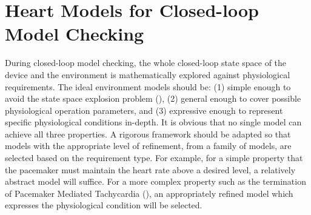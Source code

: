 \section{Heart Models for Closed-loop Model Checking}
During closed-loop model checking, the whole closed-loop state space of the device and the environment is mathematically explored against physiological requirements. The  ideal environment models should be: (1) simple enough to avoid the state space explosion problem (\cite{Abstraction}), (2) general enough to cover possible physiological operation parameters, and (3) expressive enough to represent specific physiological conditions in-depth. It is obvious that no single model can achieve all three properties. A rigorous framework should be adapted so that models with the appropriate level of refinement, from a family of models, are selected based on the requirement type. For example, for a simple property that the pacemaker must maintain the heart rate above a desired level, a relatively abstract model will suffice. For a more complex property such as the termination of Pacemaker Mediated Tachycardia (\cite{josephson}), an appropriately refined model which expresses the physiological condition will be selected.

